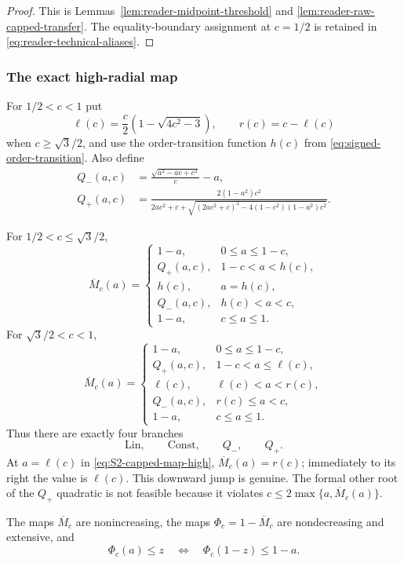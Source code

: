 \begin{proof}
This is Lemmas~\ref{lem:reader-midpoint-threshold} and
\ref{lem:reader-raw-capped-transfer}. The equality-boundary assignment at
$c=1/2$ is retained in \eqref{eq:reader-technical-aliases}.
\end{proof}

\subsubsection{The exact high-radial map}

For $1/2<c<1$ put
\[
 \ell(c)=\frac c2\left(1-\sqrt{4c^2-3}\right),\qquad
 r(c)=c-\ell(c)
\]
when $c\ge\sqrt3/2$, and
use the order-transition function $h(c)$ from
\eqref{eq:signed-order-transition}.
Also define
\begin{align*}
 Q_-(a,c)&=\frac{\sqrt{a^2-ac+c^2}}c-a,\\
 Q_+(a,c)&=
 \frac{2(1-a^2)c^2}
 {2ac^2+c+\sqrt{(2ac^2+c)^2-4(1-c^2)(1-a^2)c^2}}.
\end{align*}

\begin{proposition}
\label{prop:capped-demand-map}
For $1/2<c\le\sqrt3/2$,
\begin{equation}
 \overline M_c(a)=
 \begin{cases}
  1-a,&0\le a\le1-c,\\
  Q_+(a,c),&1-c<a<h(c),\\
  h(c),&a=h(c),\\
  Q_-(a,c),&h(c)<a<c,\\
  1-a,&c\le a\le1.
 \end{cases}
 \label{eq:S2-capped-map-low}
\end{equation}
For $\sqrt3/2<c<1$,
\begin{equation}
 \overline M_c(a)=
 \begin{cases}
  1-a,&0\le a\le1-c,\\
  Q_+(a,c),&1-c<a\le\ell(c),\\
  \ell(c),&\ell(c)<a<r(c),\\
  Q_-(a,c),&r(c)\le a<c,\\
  1-a,&c\le a\le1.
 \end{cases}
 \label{eq:S2-capped-map-high}
\end{equation}
Thus there are exactly four branches
\[
 \mathrm{Lin},\qquad \mathrm{Const},\qquad Q_-,\qquad Q_+.
\]
At $a=\ell(c)$ in \eqref{eq:S2-capped-map-high},
$\overline M_c(a)=r(c)$; immediately to its right the value is $\ell(c)$.  This
downward jump is genuine.  The formal other root of the $Q_+$ quadratic is
not feasible because it violates $c\le2\max\{a,\overline M_c(a)\}$.

The maps $\overline M_c$ are nonincreasing, the maps $\Phi_c=1-\overline M_c$ are nondecreasing
and extensive, and
\begin{equation}
 \Phi_c(a)\le z\quad\Longleftrightarrow\quad
 \Phi_c(1-z)\le1-a.
 \label{eq:S2-capped-duality}
\end{equation}
\end{proposition}

